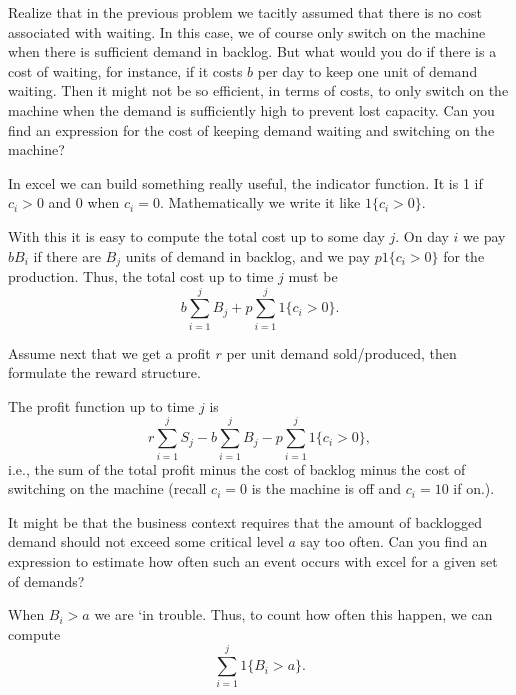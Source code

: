 \begin{question}
  Realize that in the previous problem we tacitly assumed that there
  is no cost associated with waiting.  In this case, we of course only
  switch on the machine when there is sufficient demand in
  backlog. But what would you do if there is a cost of waiting, for
  instance, if it costs $b$ per day to keep one unit of demand
  waiting. Then it might not be so efficient, in terms of costs, to
  only switch on the machine when the demand is sufficiently high to
  prevent lost capacity. Can you find an expression for the cost of
  keeping demand waiting and switching on the machine?
  \begin{solution}
    In excel we can build something really useful, the indicator
    function. It is 1 if $c_i>0$ and $0$ when $c_i=0$. Mathematically
    we write it like $1\{c_i>0\}$.  

    With this it is easy to compute the total cost up to some day
    $j$. On day $i$ we pay $b B_i$ if there are $B_j$ units of demand
    in backlog, and we pay $p 1\{c_i>0\}$ for the production. Thus,  the total cost up to time $j$ must be 
    \begin{equation*}
      b\sum_{i=1}^j B_j + p \sum_{i=1}^j 1\{c_i > 0\}.
    \end{equation*}

  \end{solution}
\end{question}

\begin{question}
  Assume next that we get a profit $r$ per unit demand sold/produced, then
formulate the reward structure.
  \begin{solution}
    The profit function up to time $j$ is
    \begin{equation*}
     r \sum_{i=1}^j S_j - b \sum_{i=1}^j B_j - p \sum_{i=1}^j 1\{c_i>0\}, 
    \end{equation*}
    i.e., the sum of the total profit minus the cost of backlog minus
    the cost of switching on the machine (recall $c_i = 0$ is the
    machine is off and $c_i = 10$ if on.).

  \end{solution}
\end{question}

\begin{question}
  It might be that the business context requires that the amount of
  backlogged demand should not exceed some critical level $a$ say too
  often. Can you find an expression to estimate how often such an
  event occurs with excel for a given set of demands?
  \begin{solution}
    When $B_i>a$ we are `in trouble. Thus, to count how often this happen, we can compute
    \begin{equation*}
      \sum_{i=1}^j 1 \{B_i > a\}.
    \end{equation*}
  \end{solution}
\end{question}

